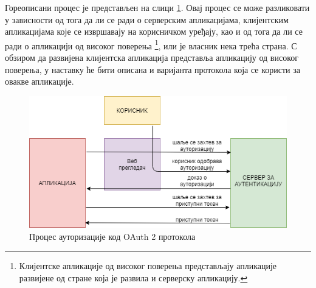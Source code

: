 \documentclass[12pt,oneside]{memoir}
\begin{document}
Гореописани процес је представљен на слици \ref{fig:oauth2}. Овај процес се може разликовати у зависности од тога да ли се ради о серверским апликацијама, клијентским апликацијама које се извршавају на корисничком уређају, као и од тога да ли се ради о апликацији од високог поверења \footnote{Клијентске апликације од високог поверења представљају апликације развијене од стране која је развила и серверску апликацију.}, или је власник нека трећа страна. С обзиром да развијена клијентска апликација представља апликацију од високог поверења, у наставку ће бити описана и варијанта протокола која се користи за овакве апликације.

\begin{figure}[!ht]
  \centering
  \includegraphics[scale=0.7]{slike/oauth2.png}
  \caption{Процес ауторизације код OAuth 2 протокола}
  \label{fig:oauth2}
\end{figure}
\end{document}
